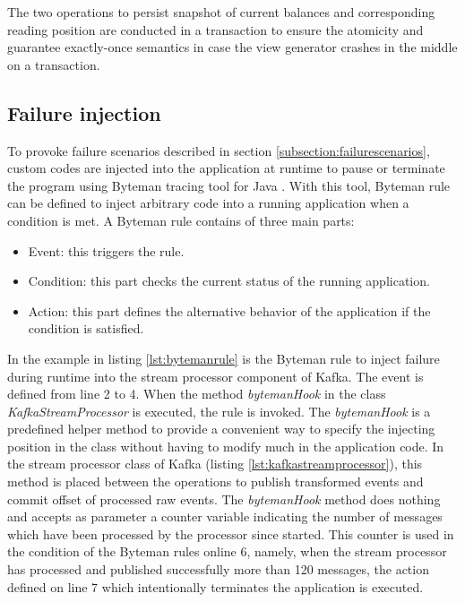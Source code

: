 The two operations to persist snapshot of current balances and corresponding reading position are conducted in a transaction to ensure the atomicity and guarantee exactly-once semantics in case the view generator crashes in the middle on a transaction.

\subsection{Failure injection}
To provoke failure scenarios described in section \ref{subsection:failurescenarios}, custom codes are injected into the application at runtime to pause or terminate the program using Byteman tracing tool for Java \cite{byteman}. With this tool, Byteman rule can be defined to inject arbitrary code into a running application when a condition is met. A Byteman rule contains of three main parts: 
\begin{itemize}
	\item Event: this triggers the rule.
	\item Condition: this part checks the current status of the running application.
	\item Action: this part defines the alternative behavior of the application if the condition is satisfied.
\end{itemize}


 

In the example in listing \ref{lst:bytemanrule} is the Byteman rule to inject failure during runtime into the stream processor component of Kafka. The event is defined from line 2 to 4. When the method \emph{bytemanHook} in the class \emph{KafkaStreamProcessor} is executed, the rule is invoked. The \emph{bytemanHook} is a predefined helper method to provide a convenient way to specify the injecting position in the class without having to modify much in the application code. In the stream processor class of Kafka (listing \ref{lst:kafkastreamprocessor}), this method is placed between the operations to publish transformed events and commit offset of processed raw events. The \emph{bytemanHook} method does nothing and accepts as parameter a counter variable indicating the number of messages which have been processed by the processor since started. This counter is used in the condition of the Byteman rules online 6, namely, when the stream processor has processed and published successfully more than 120 messages, the action defined on line 7 which intentionally terminates the application is executed.

